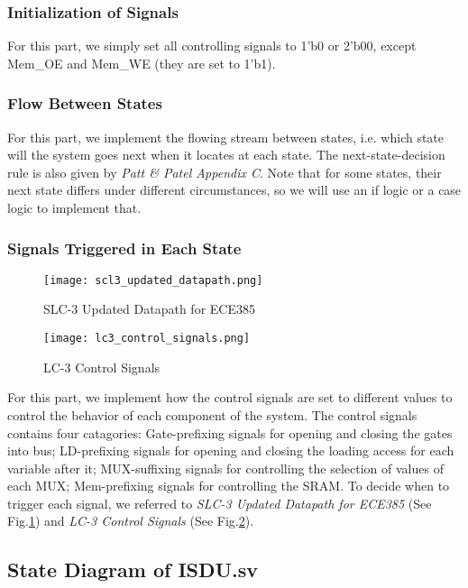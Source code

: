 \documentclass[11pt]{article}
\begin{document}
\subsubsection{Initialization of Signals}
For this part, we simply set all controlling signals to 1’b0 or 2’b00, except Mem\_OE and Mem\_WE (they are set to 1’b1).
\subsubsection{Flow Between States}
For this part, we implement the flowing stream between states, i.e. which state will the system goes next when it locates at each state. The next-state-decision rule is also given by \emph{Patt \& Patel Appendix C}. Note that for some states, their next state differs under different circumstances, so we will use an if logic or a case logic to implement that.
\subsubsection{Signals Triggered in Each State}

\begin{figure}[hp]
    \centering
    \texttt{[image: scl3\_updated\_datapath.png]}
    \caption{SLC-3 Updated Datapath for ECE385}
    \label{datapath}
\end{figure}

\begin{figure}[hp]
    \centering
    \texttt{[image: lc3\_control\_signals.png]}
    \caption{LC-3 Control Signals}
    \label{control_signals}
\end{figure}

For this part, we implement how the control signals are set to different values to control the behavior of each component of the system. The control signals contains four catagories: Gate-prefixing signals for opening and closing the gates into bus; LD-prefixing signals for opening and closing the loading access for each variable after it; MUX-suffixing signals for controlling the selection of values of each MUX; Mem-prefixing signals for controlling the SRAM. To decide when to trigger each signal, we referred to \emph{SLC-3 Updated Datapath for ECE385} (See Fig.\ref{datapath}) and \emph{LC-3 Control Signals} (See Fig.\ref{control_signals}).


\subsection{State Diagram of ISDU.sv}
\end{document}
